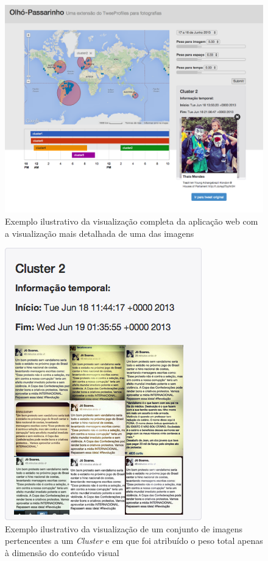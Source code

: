 \begin{figure}[h]
\centering
\includegraphics[width=0.8\linewidth]{./figures/olhopassarinho/exemplo_comp2}
\caption{Exemplo ilustrativo da visualização completa da aplicação web com a visualização mais detalhada de uma das imagens}
\label{fig:exemplocomp2}
\end{figure}

\begin{figure}[h]
\centering
\includegraphics[width=0.8\linewidth]{./figures/olhopassarinho/im1}
\caption{Exemplo ilustrativo da visualização de um conjunto de imagens pertencentes a um \textit{Cluster} e em que foi atribuído o peso total apenas à dimensão do conteúdo visual}
\label{fig:ims}
\end{figure}

